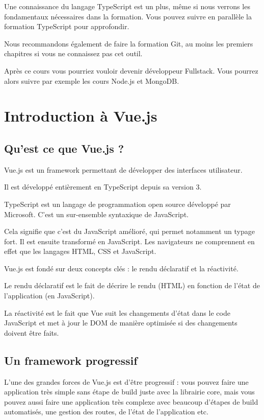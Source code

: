 \documentclass{article}
\begin{document}
Une connaissance du langage TypeScript est un plus, même si nous verrons les fondamentaux nécessaires dans la formation. Vous pouvez suivre en parallèle la formation TypeScript pour approfondir.

Nous recommandons également de faire la formation Git, au moins les premiers chapitres si vous ne connaissez pas cet outil.

Après ce cours vous pourriez vouloir devenir développeur Fullstack. Vous pourrez alors suivre par exemple les cours Node.js et MongoDB.


\section{Introduction à Vue.js}
\subsection{Qu'est ce que Vue.js ?}
Vue.js est un framework permettant de développer des interfaces utilisateur.

Il est développé entièrement en TypeScript depuis sa version 3.

TypeScript est un langage de programmation open source développé par Microsoft. C'est un sur-ensemble syntaxique de JavaScript.

Cela signifie que c'est du JavaScript amélioré, qui permet notamment un typage fort. Il est ensuite transformé en JavaScript. Les navigateurs ne comprennent en effet que les langages HTML, CSS et JavaScript.

Vue.js est fondé sur deux concepts clés : le rendu déclaratif et la réactivité.

Le rendu déclaratif est le fait de décrire le rendu (HTML) en fonction de l'état de l'application (en JavaScript).

La réactivité est le fait que Vue suit les changements d'état dans le code JavaScript et met à jour le DOM de manière optimisée si des changements doivent être faits.

\subsection{Un framework progressif}
L'une des grandes forces de Vue.js est d'être progressif : vous pouvez faire une application très simple sans étape de build juste avec la librairie core, mais vous pouvez aussi faire une application très complexe avec beaucoup d'étapes de build automatisés, une gestion des routes, de l'état de l'application etc.
\end{document}
